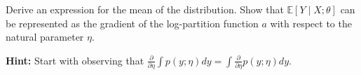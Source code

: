 \clearpage
\item {}
Derive an expression for the mean of the distribution. Show that
$\mathbb{E}[Y\mid X;\theta]$ can be represented as the gradient of the
log-partition function $a$ with respect to the natural parameter $\eta$.

\textbf{Hint:} Start with observing that $\frac{\partial}{\partial \eta} \int
p(y;\eta) dy = \int \frac{\partial}{\partial \eta} p(y;\eta) dy$.

\ifnum{}\fi

